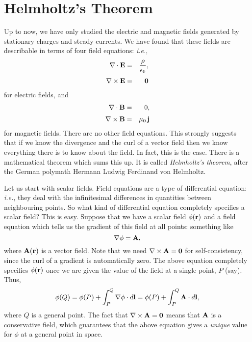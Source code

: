 \section{Helmholtz's Theorem}\label{s310}
 Up to now, we have 
only studied the 
electric and magnetic fields generated by stationary charges and steady currents.
We have found that these fields are describable in terms of four field  equations: {\em i.e.},
\begin{eqnarray}
\nabla\cdot{\bf E} &=& \frac{\rho}{\epsilon_0},\label{e3106a}\\[0.5ex]
\nabla\times{\bf E} &=& {\bf 0}\label{e3106b}
\end{eqnarray}
for electric fields,
and
\begin{eqnarray}
\nabla\cdot{\bf B} &=&0,\label{e3107a}\\[0.5ex]
\nabla\times{\bf B} &=& \mu_0\, {\bf j}\label{e3107b}
\end{eqnarray}
for magnetic fields. There are no other field equations. 
This strongly suggests that if we know the divergence and the curl of a vector field
then we know everything there is to know about the field. In fact, this is the
case. There is a mathematical theorem which sums this up. It is called
{\em Helmholtz's theorem}, after the German polymath Hermann Ludwig Ferdinand von
Helmholtz.

Let us start with scalar fields. Field equations are a type of differential equation:
{\em i.e.}, they deal with the infinitesimal differences in quantities between neighbouring
points.  So what kind of
differential equation completely specifies a
scalar field? This is easy. Suppose that we have a scalar field $\phi({\bf r})$
and a field equation which tells us the gradient of this field at all points:
something like
\begin{equation}
\nabla\phi = {\bf A},
\end{equation}
where ${\bf A}({\bf r})$ is a vector field. Note that
we need $\nabla\times{\bf A}= {\bf 0}$
for self-consistency, since the curl of a gradient is automatically zero.
The above equation completely
specifies $\phi({\bf r})$ once we are given the value of the field at a single
point, $P$ (say). Thus,
\begin{equation}
\phi(Q) = \phi(P)+\int_P^Q \nabla\phi\cdot d{\bf l} = 
\phi(P)+\int_P^Q {\bf A}\cdot d{\bf l},
\end{equation}
where $Q$ is a general point. The fact that $\nabla\times{\bf A} = {\bf 0}$ means
that ${\bf A}$ is a conservative field, which guarantees that the above
equation  gives a {\em unique}\/ value for $\phi$ at a general point in space.

